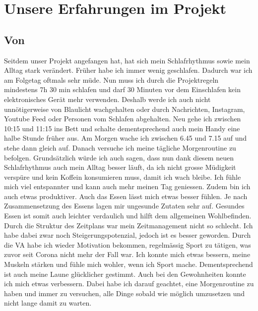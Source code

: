 \section{Unsere Erfahrungen im Projekt}
\subsection{Von \bastian}
\authortoc{\bastian}{\subsectionident}
Seitdem unser Projekt angefangen hat, hat sich mein Schlafrhythmus sowie mein Alltag stark verändert. Früher habe ich immer wenig geschlafen. Dadurch war ich am Folgetag oftmals sehr müde. Nun muss ich durch die Projektregeln mindestens 7h 30 min schlafen und darf 30 Minuten vor dem Einschlafen kein elektronisches Gerät mehr verwenden. Deshalb werde ich auch nicht unnötigerweise von Blaulicht wachgehalten oder durch Nachrichten, Instagram, Youtube Feed oder Personen vom Schlafen abgehalten. Neu gehe ich zwischen 10:15 und 11:15 ins Bett und schalte dementsprechend auch mein Handy eine halbe Stunde früher aus. Am Morgen wache ich zwischen 6.45 und 7.15 auf und stehe dann gleich auf. Danach versuche ich meine tägliche Morgenroutine zu befolgen. Grundsätzlich würde ich auch sagen, dass nun dank diesem neuen Schlafrhythmus auch mein Alltag besser läuft, da ich nicht grosse Müdigkeit verspüre und kein Koffein konsumieren muss, damit ich wach bleibe. Ich fühle mich viel entspannter und kann auch mehr meinen Tag geniessen. Zudem bin ich auch etwas produktiver. Auch das Essen lässt mich etwas besser fühlen. Je nach Zusammensetzung des Essens lagen mir ungesunde Zutaten sehr auf. Gesundes Essen ist somit auch leichter verdaulich und hilft dem allgemeinen Wohlbefinden. Durch die Struktur des Zeitplans war mein Zeitmanagement nicht so schlecht. Ich habe dabei zwar noch Steigerungspotenzial, jedoch ist es besser geworden. Durch die VA habe ich wieder Motivation bekommen, regelmässig Sport zu tätigen, was zuvor seit Corona nicht mehr der Fall war. Ich konnte mich etwas bessern, meine Muskeln stärken und fühle mich wohler, wenn ich Sport mache. Dementsprechend ist auch meine Laune glücklicher gestimmt. Auch bei den Gewohnheiten konnte ich mich etwas verbessern. Dabei habe ich darauf geachtet, eine Morgenroutine zu haben und immer zu versuchen, alle Dinge sobald wie möglich umzusetzen und nicht lange damit zu warten.
